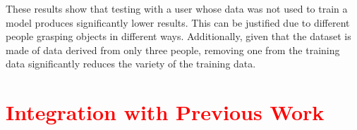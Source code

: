 These results show that testing with a user whose data was not used to train a model produces significantly lower results. This can be justified due to different people grasping objects in different ways. Additionally, given that the dataset is made of data derived from only three people, removing one from the training data significantly reduces the variety of the training data.

\section{\textcolor{red}{Integration with Previous Work}}
